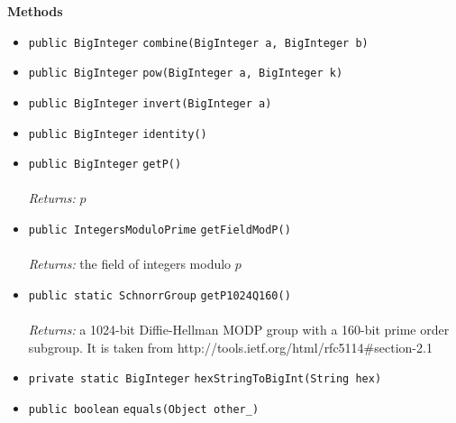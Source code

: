 \textbf{\sffamily Methods}
\begin{itemize}
\item \lstinline|public BigInteger| \lstinline|combine|\lstinline|(BigInteger a, BigInteger b)| \\[-0.6em]




\item \lstinline|public BigInteger| \lstinline|pow|\lstinline|(BigInteger a, BigInteger k)| \\[-0.6em]




\item \lstinline|public BigInteger| \lstinline|invert|\lstinline|(BigInteger a)| \\[-0.6em]




\item \lstinline|public BigInteger| \lstinline|identity|\lstinline|()| \\[-0.6em]




\item \lstinline|public BigInteger| \lstinline|getP|\lstinline|()|\\ \\[-0.6em]
\emph{Returns:} $p$



\item \lstinline|public IntegersModuloPrime| \lstinline|getFieldModP|\lstinline|()|\\ \\[-0.6em]
\emph{Returns:} the field of integers modulo $p$



\item \lstinline|public static SchnorrGroup| \lstinline|getP1024Q160|\lstinline|()|\\ \\[-0.6em]
\emph{Returns:} a 1024-bit Diffie-Hellman MODP group
 with a 160-bit prime order subgroup.
 It is taken from http://tools.ietf.org/html/rfc5114\#section-2.1



\item \lstinline|private static BigInteger| \lstinline|hexStringToBigInt|\lstinline|(String hex)| \\[-0.6em]




\item \lstinline|public boolean| \lstinline|equals|\lstinline|(Object other_)| \\[-0.6em]




\end{itemize}

